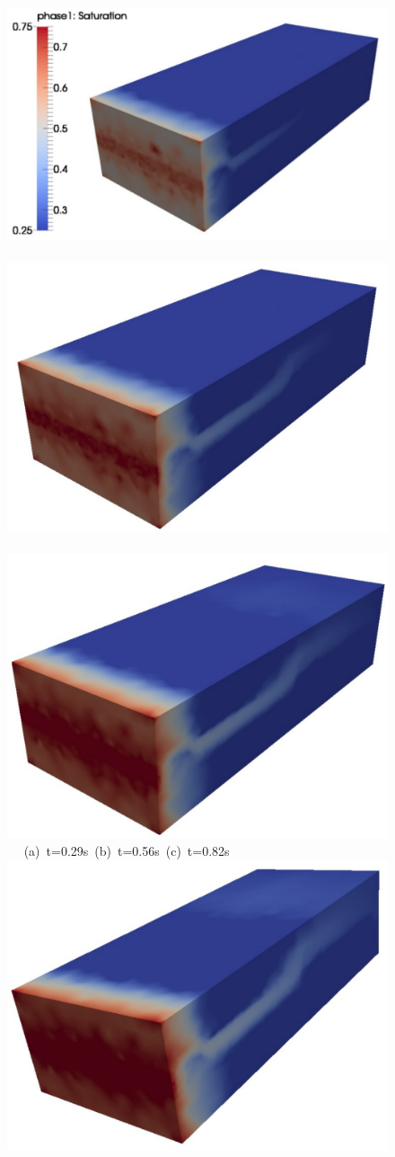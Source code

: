 \begin{landscape}
\begin{figure}[ht]
  \vbox{\vspace{-.5cm}
      \hbox{\includegraphics[width=.6\textwidth]{./Pics1/3D_Channel/3D_channel_sat_30.pdf} 
            \includegraphics[width=.5\textwidth]{./Pics1/3D_Channel/3D_channel_sat_60.pdf}
            \includegraphics[width=.5\textwidth]{./Pics1/3D_Channel/3D_channel_sat_90.pdf} } 
      \hbox{\hspace{2.cm} (a) t=0.29s \hspace{5.cm} (b) t=0.56s \hspace{4.cm} (c) t=0.82s}
      \vspace{0.5cm}
      \hbox{\hspace{.5cm} 
            \includegraphics[width=.5\textwidth]{./Pics1/3D_Channel/3D_channel_sat_110.pdf}
}}
\end{figure}
\end{landscape}
